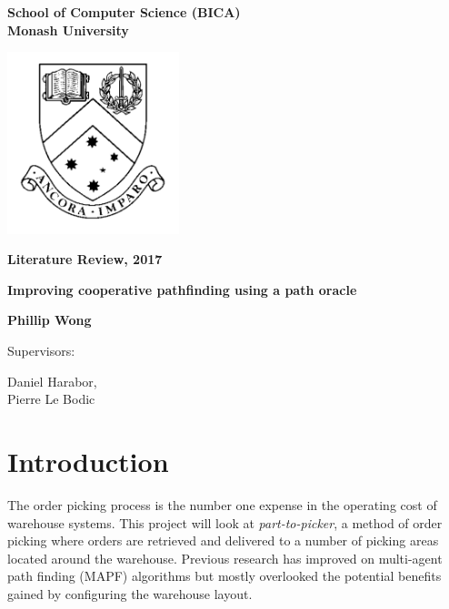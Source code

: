 \documentclass[a4paper,11pt]{article}
\begin{document}
\thispagestyle{empty} %
\renewcommand{\thepage}{\roman{page}}

\begin{spacing}{1.5}
\begin{center}
{\Large \bfseries
School of Computer Science (BICA) \\
Monash University}


\vspace*{30mm}

\includegraphics[width=5cm]{graphics/MonashCrest.pdf}

\vspace*{15mm}

{\large \bfseries
Literature Review, 2017
}

\vspace*{10mm}

{\LARGE \bfseries
Improving cooperative pathfinding using a path oracle
}

\vspace*{20mm}

{\large \bfseries
Phillip Wong

\vspace*{20mm}


Supervisors: \parbox[t]{50mm}{Daniel Harabor,\\Pierre Le Bodic}
}

\end{center}
\end{spacing}

\newpage

\tableofcontents

\newpage
\setcounter{page}{1}
\renewcommand{\thepage}{\arabic{page}}


	
\section{Introduction}
The order picking process is the number one expense in the operating cost of warehouse systems. This project will look at \textit{part-to-picker}, a method of order picking where orders are retrieved and delivered to a number of picking areas located around the warehouse. Previous research has improved on multi-agent path finding (MAPF) algorithms but mostly overlooked the potential benefits gained by configuring the warehouse layout.
\end{document}
